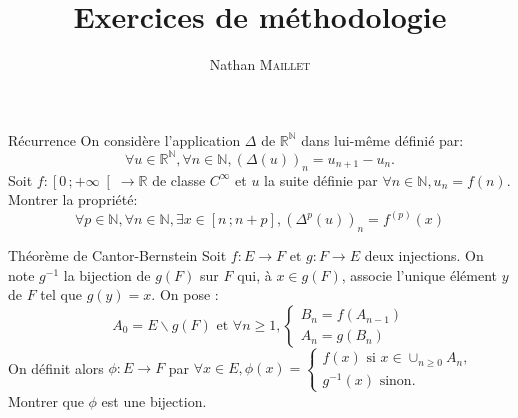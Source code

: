 \documentclass[french, a4paper, 11pt]{article}
\title{Exercices de méthodologie}
\author{Nathan \textsc{Maillet}}
\date{}
\newcommand{\N}{\mathbb{N}}   %
\newcommand{\R}{\mathbb{R}}   %
\newcommand{\interfo}[2]{\left[#1\,;#2\right[}   %
\newcommand{\interff}[2]{\left[#1\,;#2\right]}   %
\begin{document}
\maketitle
\begin{cadre}{Récurrence}
    On considère l'application $\Delta$ de $\R^{\N}$ dans lui-même définié par:
        \[\forall u \in \R^{\N}, \forall n \in \N, (\Delta(u))_n=u_{n+1}-u_n.\]
    Soit \(f: \interfo{0}{+\infty} \rightarrow \R\) de classe \(C^{\infty}\) et $u$ la suite définie par \(\forall n \in \N, u_n=f(n)\). Montrer la propriété:
        \[\forall p \in \N, \forall n \in \N, \exists x \in \interff{n}{n+p}, (\Delta^p(u))_n=f^{(p)}(x)\]
\end{cadre}

\begin{cadre}{Théorème de Cantor-Bernstein}
    Soit \(f:E \rightarrow F \text{ et } g: F \rightarrow E\) deux injections. On note $g^{-1}$ la bijection de $g(F)$ sur $F$ qui, à \(x \in g(F)\), associe l'unique élément $y$ de $F$ tel que \(g(y)=x\). On pose :
        \[A_0=E\backslash g(F) \text{ et } \forall n \geq 1, \begin{cases}
            B_n=f(A_{n-1}) \\
            A_n=g(B_n)
        \end{cases} \]
      On définit alors \(\phi : E \rightarrow F\) par \(\forall x \in E, \phi(x)=
      \begin{cases}
        f(x) \text{ si } x \in \cup_{n\geq 0}A_n, \\
        g^{-1}(x) \text{ sinon}.
    \end{cases}\)
    Montrer que $\phi$ est une bijection.
\end{cadre}
\end{document}
